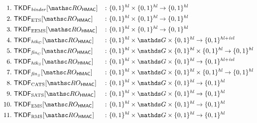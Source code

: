 {
\allowdisplaybreaks
\begin{align*}
1.~ &\TLSKDF_{\binder}[\ROhmac]	&&\colon \bits^{\hashlen} \times \bits^{\hashlen} \to \bits^{\hashlen} \\
2.~ &\TLSKDF_{\ets}[\ROhmac]	&&\colon \bits^{\hashlen} \times \bits^{\hashlen} \to \bits^{\hashlen} \\
3.~ &\TLSKDF_{\eems}[\ROhmac]	&&\colon \bits^{\hashlen} \times \bits^{\hashlen}  \to \bits^{\hashlen}\\
4.~ &\TLSKDF_{\chtk}[\ROhmac]	&&\colon \bits^{\hashlen}\times \G \times \bits^{\hashlen} \to \bits^{\hashlen + \ivlen} \\
5.~ &\TLSKDF_{\cfin}[\ROhmac]		&&\colon \bits^{\hashlen} \times \G \times \bits^{\hashlen} \times \bits^{\hashlen} \to \bits^{\hashlen} \\
6.~ &\TLSKDF_{\shtk}[\ROhmac]	&&\colon \bits^{\hashlen} \times \G \times \bits^{\hashlen} \to \bits^{\hashlen + \ivlen} \\
7.~ &\TLSKDF_{\sfin}[\ROhmac]		&&\colon \bits^{\hashlen} \times \G \times \bits^{\hashlen} \times \bits^{\hashlen} \to \bits^{\hashlen} \\
8.~ &\TLSKDF_{\cats}[\ROhmac]	&&\colon \bits^{\hashlen}\times \G \times \bits^{\hashlen} \to \bits^{\hashlen} \\
9.~ &\TLSKDF_{\sats}[\ROhmac] &&\colon \bits^{\hashlen} \times \G \times \bits^{\hashlen} \to \bits^{\hashlen} \\
10.~ &\TLSKDF_{\ems}[\ROhmac]	&&\colon \bits^{\hashlen} \times \G \times \bits^{\hashlen} \to \bits^{\hashlen} \\
11.~ &\TLSKDF_{\rms}[\ROhmac]	&&\colon \bits^{\hashlen} \times \G \times \bits^{\hashlen} \to \bits^{\hashlen}
\end{align*}
}